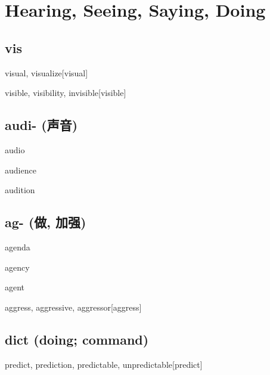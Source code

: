 \chapter{Hearing, Seeing, Saying, Doing}

\section{vis}
\begin{RefWord}{visual, visualize}[visual]
\end{RefWord}

\begin{RefWord}{visible, visibility, invisible}[visible]
\end{RefWord}

\section{audi- (声音)}
\begin{RefWord}{audio}
\end{RefWord}

\begin{RefWord}{audience}
\end{RefWord}

\begin{RefWord}{audition}
\end{RefWord}

\section{{ag- (做, 加强)}}

\begin{RefWord}{agenda}
\end{RefWord}

\begin{RefWord}{agency}
\end{RefWord}

\begin{RefWord}{agent}
\end{RefWord}

\begin{RefWord}{aggress, aggressive, aggressor}[aggress]
\end{RefWord}

\section{dict (doing; command)}

\begin{RefWord}{predict, prediction, predictable, unpredictable}[predict]
\end{RefWord}

